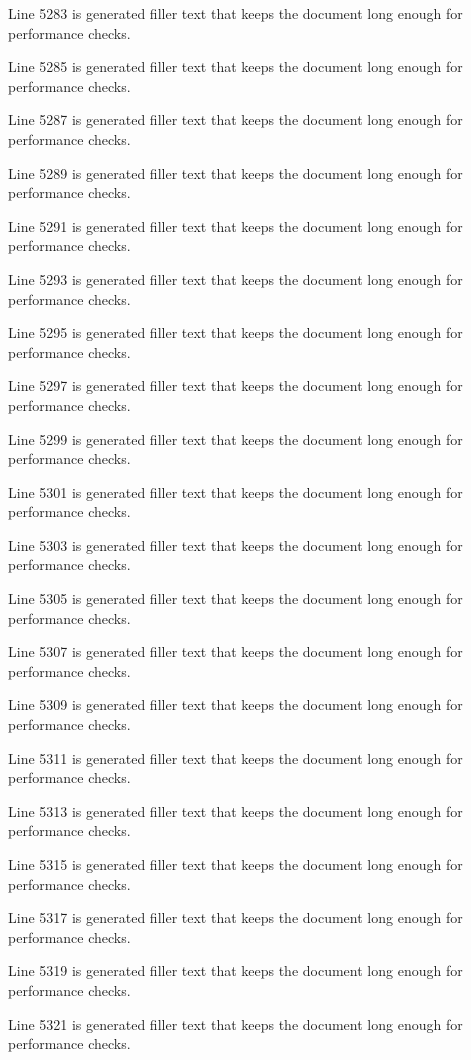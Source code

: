 Line 5283 is generated filler text that keeps the document long enough for performance checks.

Line 5285 is generated filler text that keeps the document long enough for performance checks.

Line 5287 is generated filler text that keeps the document long enough for performance checks.

Line 5289 is generated filler text that keeps the document long enough for performance checks.

Line 5291 is generated filler text that keeps the document long enough for performance checks.

Line 5293 is generated filler text that keeps the document long enough for performance checks.

Line 5295 is generated filler text that keeps the document long enough for performance checks.

Line 5297 is generated filler text that keeps the document long enough for performance checks.

Line 5299 is generated filler text that keeps the document long enough for performance checks.

Line 5301 is generated filler text that keeps the document long enough for performance checks.

Line 5303 is generated filler text that keeps the document long enough for performance checks.

Line 5305 is generated filler text that keeps the document long enough for performance checks.

Line 5307 is generated filler text that keeps the document long enough for performance checks.

Line 5309 is generated filler text that keeps the document long enough for performance checks.

Line 5311 is generated filler text that keeps the document long enough for performance checks.

Line 5313 is generated filler text that keeps the document long enough for performance checks.

Line 5315 is generated filler text that keeps the document long enough for performance checks.

Line 5317 is generated filler text that keeps the document long enough for performance checks.

Line 5319 is generated filler text that keeps the document long enough for performance checks.

Line 5321 is generated filler text that keeps the document long enough for performance checks.

